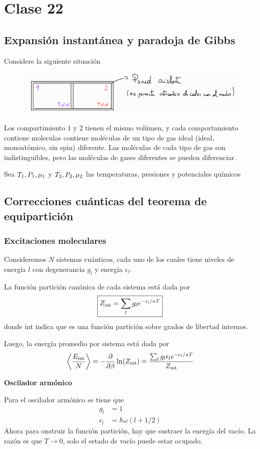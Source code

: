 \section{Clase 22}
\subsection{Expansión instantánea y paradoja de Gibbs}
Considere la siguiente situación
\begin{figure}[h!]
	\centering
	\includegraphics[scale=0.3]{fig/22-img.png}
\end{figure}
Los compartimiento $1$ y $2$ tienen el mismo volúmen, y cada comportamiento contiene moleculas contiene moléculas de un tipo de gas ideal (ideal, monoatómico, sin spin) diferente. Las moléculas de cada tipo de gas son indistinguibles, pero las moléculas de gases diferentes se pueden diferenciar.

Sea $T_1,P_1,\mu_1$ y $T_2,P_2,\mu_2$  las temperaturas, presiones y potenciales químicos 





\subsection{Correcciones cuánticas del teorema de equipartición}
\subsubsection{Excitaciones moleculares}
Consideremos $N$ sistemas cuánticos, cada uno de los cuales tiene niveles de energía $l$ con degenerancia $g_l$ y energía $\epsilon_l$.

La función partición canónica de cada sistema está dada por
\begin{equation}
\boxed{  Z_{\rm int}=\sum_lg_le^{-\epsilon_l/\kappa T}}
\end{equation}
donde int indica que es una función partición sobre grados de libertad internos.

Luego, la energía promedio por sistema está dada por
\begin{equation}
  \ev{\frac{E_{\rm int}}{N}}=-\pdv{\b}\ln(Z_{\rm int	})=\frac{\sum_lg_l\epsilon_le^{-\epsilon_l/\k T}}{Z_{\rm int}}
\end{equation}

\begin{ej} \textbf{Oscilador armónico}
	
	Para el oscilador armónico se tiene que
	\begin{align}
  g_l&=1\\
  \epsilon_l&=\hbar\omega(l+1/2)
\end{align}
Ahora para onstruir la función partición, hay que sustraer la energía del vacío. La razón es que $T\to 0$, solo el estado de vacío puede estar ocupado.
\end{ej}
